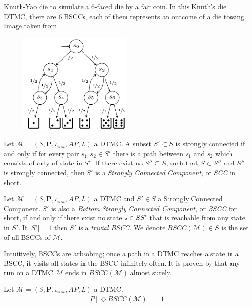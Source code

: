 \begin{example}
    Knuth-Yao die to simulate a 6-faced die by a fair coin. In this Knuth's die DTMC, there are 6
    BSCCs, each of them represents an outcome of a die tossing. Image taken from
    \cite{katoen2016probabilistic}
    \begin{figure}[H]
        \centering
        \includegraphics[width=0.5\textwidth]{figures/knuth_die.png}
        \label{fig:knuth-die}
    \end{figure}
\end{example}

\begin{definition}
    Let $\mathcal{M}=(S,\mathbf{P}, \iota_{init}, AP,L)$ a DTMC. A subset $S'\subset S$ is strongly
    connected if and only if for every pair $s_1,s_2\in S'$ there is a path between $s_1$ and $s_2$
    which consists of only of state in $S'$. If there exist no $S''\subseteq S$, such that $S\subset
        S''$ and $S''$ is strongly connected, then $S'$ is a \textit{Strongly Connected Component}, or
    \textit{SCC} in short.
\end{definition}

\begin{definition}
    Let $\mathcal{M}=(S,\mathbf{P}, \iota_{init}, AP,L)$ a DTMC and $S'\in S$ a Strongly Connected
    Component. $S'$ is also a \textit{Bottom Strongly Connected Component}, or \textit{BSCC} for
    short, if and only if there exist no state $s \in S\\S'$ that is reachable from any state in
    $S'$. If $|S'|=1$ then $S'$ is a \textit{trivial BSCC}. We denote $BSCC(\mathcal{M})\in S$ is
    the set of all BSCCs of $\mathcal{M}$.
\end{definition}
Intuitively, BSCCs are arbsobing; once a path in a DTMC reaches a state in a BSCC, it visits  all
states in the BSCC infinitely often. It is proven by \cite{baier2008principles} that any run on a
DTMC $\mathcal{M}$ ends in $BSCC(\mathcal{M})$ almost surely.
\begin{theorem}
    Let $\mathcal{M}=(S,\mathbf{P}, \iota_{init}, AP,L)$ a DTMC.
    \begin{align*}
        P[\Diamond BSCC(\mathcal{M})] = 1
    \end{align*}
\end{theorem}

